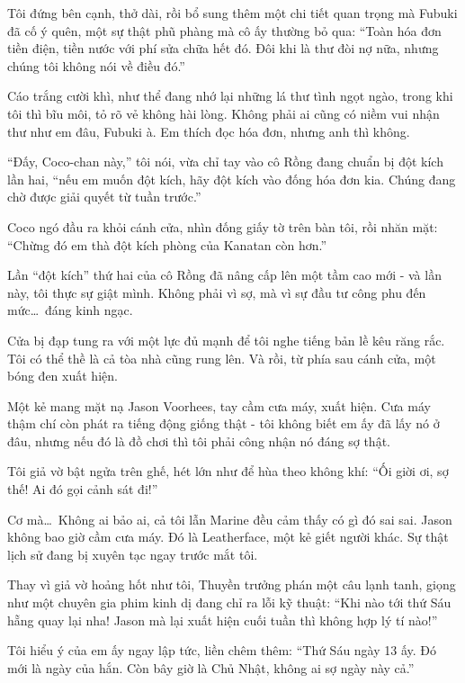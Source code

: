\documentclass[../main.tex]{subfiles}
\begin{document}

Tôi đứng bên cạnh, thở dài, rồi bổ sung thêm một chi tiết quan trọng mà Fubuki đã cố ý quên, một sự thật phũ phàng mà cô ấy thường bỏ qua: ``Toàn hóa đơn tiền điện, tiền nước với phí sửa chữa hết đó. Đôi khi là thư đòi nợ nữa, nhưng chúng tôi không nói về điều đó.''

Cáo trắng cười khì, như thể đang nhớ lại những lá thư tình ngọt ngào, trong khi tôi thì bĩu môi, tỏ rõ vẻ không hài lòng. Không phải ai cũng có niềm vui nhận thư như em đâu, Fubuki à. Em thích đọc hóa đơn, nhưng anh thì không.

``Đấy, Coco-chan này,'' tôi nói, vừa chỉ tay vào cô Rồng đang chuẩn bị đột kích lần hai, ``nếu em muốn đột kích, hãy đột kích vào đống hóa đơn kia. Chúng đang chờ được giải quyết từ tuần trước.''

Coco ngó đầu ra khỏi cánh cửa, nhìn đống giấy tờ trên bàn tôi, rồi nhăn mặt: ``Chừng đó em thà đột kích phòng của Kanatan còn hơn.''

\il

\ct

Lần ``đột kích'' thứ hai của cô Rồng đã nâng cấp lên một tầm cao mới - và lần này, tôi thực sự giật mình. Không phải vì sợ, mà vì sự đầu tư công phu đến mức\dots\ đáng kinh ngạc.

Cửa bị đạp tung ra với một lực đủ mạnh để tôi nghe tiếng bản lề kêu răng rắc. Tôi có thể thề là cả tòa nhà cũng rung lên. Và rồi, từ phía sau cánh cửa, một bóng đen xuất hiện.


Một kẻ mang mặt nạ Jason Voorhees, tay cầm cưa máy, xuất hiện. Cưa máy thậm chí còn phát ra tiếng động giống thật - tôi không biết em ấy đã lấy nó ở đâu, nhưng nếu đó là đồ chơi thì tôi phải công nhận nó đáng sợ thật.

Tôi giả vờ bật ngửa trên ghế, hét lớn như để hùa theo không khí: ``Ối giời ơi, sợ thế! Ai đó gọi cảnh sát đi!''

Cơ mà\dots\ Không ai bảo ai, cả tôi lẫn Marine đều cảm thấy có gì đó sai sai. Jason không bao giờ cầm cưa máy. Đó là Leatherface, một kẻ giết người khác. Sự thật lịch sử đang bị xuyên tạc ngay trước mắt tôi.

Thay vì giả vờ hoảng hốt như tôi, Thuyền trưởng phán một câu lạnh tanh, giọng như một chuyên gia phim kinh dị đang chỉ ra lỗi kỹ thuật: ``Khi nào tới thứ Sáu hẵng quay lại nha! Jason mà lại xuất hiện cuối tuần thì không hợp lý tí nào!''

Tôi hiểu ý của em ấy ngay lập tức, liền chêm thêm: ``Thứ Sáu ngày 13 ấy. Đó mới là ngày của hắn. Còn bây giờ là Chủ Nhật, không ai sợ ngày này cả.''
\end{document}
